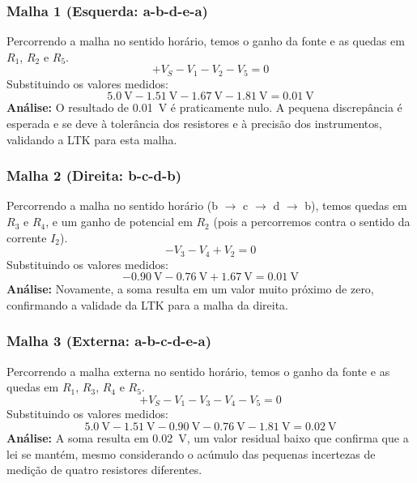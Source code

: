 \documentclass[a4paper, 12pt]{article}
\begin{document}
\subsubsection{Malha 1 (Esquerda: a-b-d-e-a)}
Percorrendo a malha no sentido horário, temos o ganho da fonte e as quedas em $R_1$, $R_2$ e $R_5$.
\begin{equation*}
+V_S - V_1 - V_2 - V_5 = 0
\end{equation*}
Substituindo os valores medidos:
\begin{equation*}
\SI{5.0}{\volt} - \SI{1.51}{\volt} - \SI{1.67}{\volt} - \SI{1.81}{\volt} = \SI{+0.01}{\volt}
\end{equation*}
\textbf{Análise:} O resultado de \SI{+0.01}{\volt} é praticamente nulo. A pequena discrepância é esperada e se deve à tolerância dos resistores e à precisão dos instrumentos, validando a LTK para esta malha.

\subsubsection{Malha 2 (Direita: b-c-d-b)}
Percorrendo a malha no sentido horário (b $\rightarrow$ c $\rightarrow$ d $\rightarrow$ b), temos quedas em $R_3$ e $R_4$, e um ganho de potencial em $R_2$ (pois a percorremos contra o sentido da corrente $I_2$).
\begin{equation*}
-V_3 - V_4 + V_2 = 0
\end{equation*}
Substituindo os valores medidos:
\begin{equation*}
-\SI{0.90}{\volt} - \SI{0.76}{\volt} + \SI{1.67}{\volt} = \SI{+0.01}{\volt}
\end{equation*}
\textbf{Análise:} Novamente, a soma resulta em um valor muito próximo de zero, confirmando a validade da LTK para a malha da direita.

\subsubsection{Malha 3 (Externa: a-b-c-d-e-a)}
Percorrendo a malha externa no sentido horário, temos o ganho da fonte e as quedas em $R_1$, $R_3$, $R_4$ e $R_5$.
\begin{equation*}
+V_S - V_1 - V_3 - V_4 - V_5 = 0
\end{equation*}
Substituindo os valores medidos:
\begin{equation*}
\SI{5.0}{\volt} - \SI{1.51}{\volt} - \SI{0.90}{\volt} - \SI{0.76}{\volt} - \SI{1.81}{\volt} = \SI{+0.02}{\volt}
\end{equation*}
\textbf{Análise:} A soma resulta em \SI{+0.02}{\volt}, um valor residual baixo que confirma que a lei se mantém, mesmo considerando o acúmulo das pequenas incertezas de medição de quatro resistores diferentes.
\end{document}
